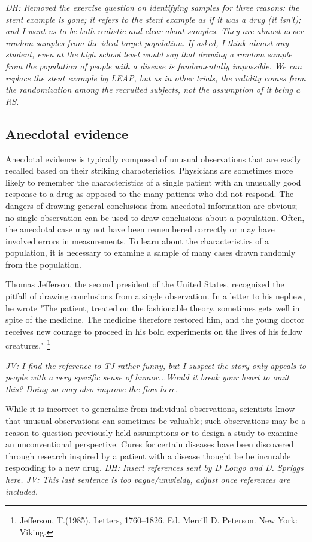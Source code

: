 \begin{doublespace}
\textit{DH: Removed the exercise question on identifying samples for three reasons: the stent example is gone; it refers to the stent example as if it was a drug (it isn't); and I want us to be both realistic and clear about samples.  They are almost never random samples from the ideal target population. If asked, I think almost any student, even at the high school level would say that drawing a random sample from the population of people with a disease is fundamentally impossible.  We can replace the stent example by LEAP, but as in other trials, the validity comes from the randomization among the recruited subjects, not the assumption of it being a RS.}

\subsection{Anecdotal evidence}
\label{anecdotalEvidence}

Anecdotal evidence is typically composed of unusual observations that are easily recalled based on their striking characteristics. Physicians are sometimes more likely to remember the characteristics of a single patient with an unusually good response to a drug as opposed to the many patients who did not respond.  The dangers of drawing general conclusions from anecdotal information are obvious; no single observation can be used to draw conclusions about a population. Often, the anecdotal case may not have been remembered correctly or may have involved errors in measurements.  To learn about the characteristics of a population, it is necessary to examine a sample of many cases drawn randomly from the population.

Thomas Jefferson, the second president of the United States, recognized the pitfall of
drawing conclusions from a single observation. In a letter to his nephew, he wrote "The patient, treated on the fashionable theory, sometimes gets well in spite of the medicine. The medicine therefore restored him, and the young doctor receives new courage to proceed in his bold experiments on the lives of his fellow creatures." \footnote{Jefferson, T.(1985). Letters, 1760–1826. Ed. Merrill D. Peterson. New York: Viking.}

\textit{JV: I find the reference to TJ rather funny, but I suspect the story only appeals to people with a very specific sense of humor...Would it break your heart to omit this? Doing so may also improve the flow here.}

While it is incorrect to generalize from individual observations, scientists know that unusual observations can sometimes be valuable; such observations may be a reason to question previously held assumptions or to design a study to examine an unconventional perspective.  Cures for certain diseases have been discovered through research inspired by a patient with a disease thought be be incurable responding to a new drug.  \textit{DH: Insert references sent by D Longo and D. Spriggs here. JV: This last sentence is too vague/unwieldy, adjust once references are included.}  


\end{doublespace}
